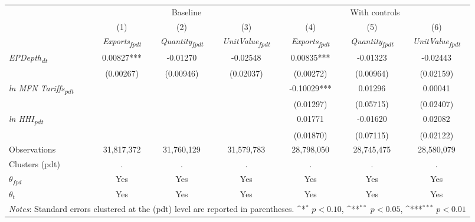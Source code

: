 {
\def\sym#1{\ifmmode^{#1}\else\(^{#1}\)\fi}
\begin{tabular}{l*{6}{c}}
\toprule
                &\multicolumn{3}{c}{Baseline}                            &\multicolumn{3}{c}{With controls}                       \\\cmidrule(lr){2-4}\cmidrule(lr){5-7}
                &\multicolumn{1}{c}{(1)}&\multicolumn{1}{c}{(2)}&\multicolumn{1}{c}{(3)}&\multicolumn{1}{c}{(4)}&\multicolumn{1}{c}{(5)}&\multicolumn{1}{c}{(6)}\\
                &\multicolumn{1}{c}{\textit{Exports\textsubscript{fpdt}}}&\multicolumn{1}{c}{\textit{Quantity\textsubscript{fpdt}}}&\multicolumn{1}{c}{\textit{UnitValue\textsubscript{fpdt}}}&\multicolumn{1}{c}{\textit{Exports\textsubscript{fpdt}}}&\multicolumn{1}{c}{\textit{Quantity\textsubscript{fpdt}}}&\multicolumn{1}{c}{\textit{UnitValue\textsubscript{fpdt}}}\\
\midrule
\textit{EPDepth\textsubscript{dt}} & 0.00827*** & -0.01270 & -0.02548 & 0.00835*** & -0.01323 & -0.02443\\
 & (0.00267) & (0.00946) & (0.02037) & (0.00272) & (0.00964) & (0.02159)\\
\addlinespace
\textit{ln MFN Tariffs\textsubscript{pdt}} &  &  &  & -0.10029*** & 0.01296 & 0.00041\\
 &  &  &  & (0.01297) & (0.05715) & (0.02407)\\
\addlinespace
\textit{ln HHI\textsubscript{pdt}} &  &  &  & 0.01771 & -0.01620 & 0.02082\\
 &  &  &  & (0.01870) & (0.07115) & (0.02122)\\
\addlinespace
\midrule
\midrule
Observations & 31,817,372 & 31,760,129 & 31,579,783 & 28,798,050 & 28,745,475 & 28,580,079\\
Clusters (pdt) & . & . & . & . & . & .\\
$\theta_{fpd}$ & Yes & Yes & Yes & Yes & Yes & Yes\\
$\theta_t$ & Yes & Yes & Yes & Yes & Yes & Yes\\
\bottomrule
\multicolumn{7}{l}{\footnotesize \textit{Notes}: Standard errors clustered at the (pdt) level are reported in parentheses. \sym{*} \(p<0.10\), \sym{**} \(p<0.05\), \sym{***} \(p<0.01\)}\\
\end{tabular}
}
